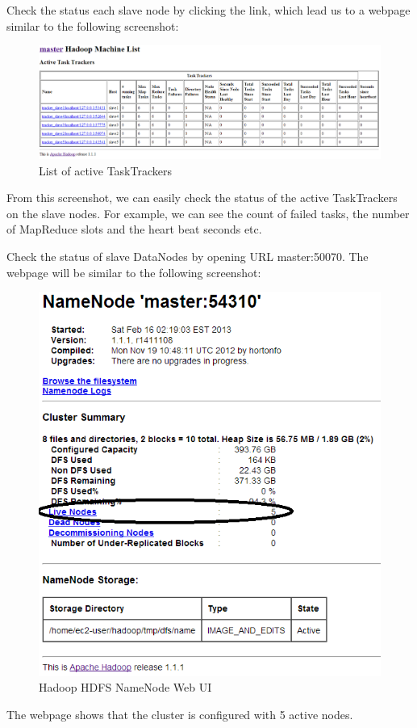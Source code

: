 Check the status each slave node by clicking the link, which lead us to a webpage similar to the following screenshot:

\begin{figure}[h]
  \centering
  \includegraphics[width=.8\textwidth]{figs/5163OS_03_03.png}
  \caption{List of active TaskTrackers}\label{fig:active.trackers}
\end{figure} 


From this screenshot, we can easily check the status of the active TaskTrackers on the slave nodes. For example, we can see the count of failed tasks, the number of MapReduce slots and the heart beat seconds etc.

Check the status of slave DataNodes by opening URL master:50070. The webpage will be similar to the following screenshot: \\
\begin{figure}[h]
  \centering
  \includegraphics[width=.6\textwidth]{figs/5163OS_03_04.png}
  \caption{Hadoop HDFS NameNode Web UI}\label{fig:namenode.webui}
\end{figure} 

The webpage shows that the cluster is configured with 5 active nodes.

